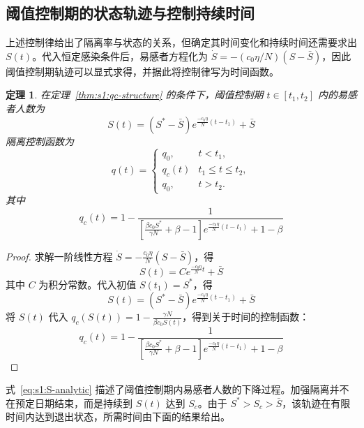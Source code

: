 \documentclass[UTF8,a4paper,10pt,fontset=fandol]{ctexart}
\theoremstyle{cnplain}
\newtheorem{theorem}{定理}[section]
\theoremstyle{remark}
\numberwithin{equation}{section}
\begin{document}
\subsection{阈值控制期的状态轨迹与控制持续时间}
上述控制律给出了隔离率与状态的关系，但确定其时间变化和持续时间还需要求出 $S(t)$。代入恒定感染条件后，易感者方程化为 $\dot S=-(c_0\eta/N)(S-\bar S)$，因此阈值控制期轨迹可以显式求得，并据此将控制律写为时间函数。
\begin{theorem}
    在定理~\ref{thm:s1:qc-structure} 的条件下，阈值控制期 $t\in[t_1,t_2]$ 内的易感者人数为
    \begin{equation}
        S(t) = \left( S^* - \bar S \right) e^{\frac{-c_0\eta}{N}(t - t_1 )} + \bar S
        \label{eq:s1:S-analytic}
    \end{equation}
    隔离控制函数为
    \begin{equation*}
    q(t) =
    \begin{cases}
    q_0, & t < t_1, \\
    q_c(t) & t_1 \le t \le t_2, \\
    q_0, & t > t_2.       
    \end{cases}
    \end{equation*}
    其中
    \begin{equation}
        q_c(t)= 1 - \frac{1}{\left[\frac{\beta c_0 S^* }{\gamma N} + \beta- 1 \right] e^{\frac{-c_0 \eta}{N} (t-t_1)} + 1-\beta} 
    \end{equation}
\end{theorem}
\begin{proof}
    求解一阶线性方程 $\dot{S}=-\frac{c_0\eta}{N}(S-\bar S)$，得
    \[
        S(t) = C e^{\frac{-c_0 \eta}{N} t} + \bar S
    \]
    其中 $C$ 为积分常数。代入初值 $S(t_1)=S^*$，得
    \[
    S(t) = \left( S^* - \bar S \right) e^{\frac{-c_0\eta}{N}(t - t_1 )} + \bar S
    \]
    将 $S(t)$ 代入 $q_c(S(t))=1-\frac{\gamma N}{\beta c_0 S(t)}$，得到关于时间的控制函数：
    \[
    q_c(t)= 1 - \frac{1}{\left[\frac{\beta c_0 S^* }{\gamma N} + \beta- 1 \right] e^{\frac{-c_0 \eta}{N} (t-t_1)} + 1-\beta}
    \]
\end{proof}
式~\eqref{eq:s1:S-analytic} 描述了阈值控制期内易感者人数的下降过程。加强隔离并不在预定日期结束，而是持续到 $S(t)$ 达到 $S_c$。由于 $S^*>S_c>\bar S$，该轨迹在有限时间内达到退出状态，所需时间由下面的结果给出。
\end{document}
